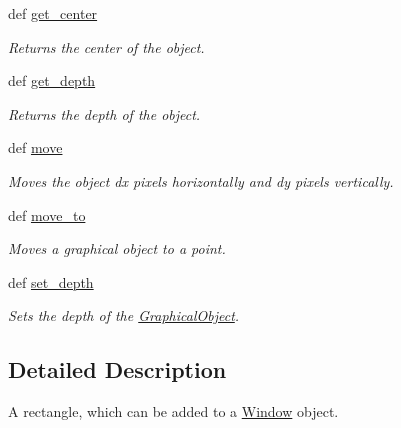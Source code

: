 \begin{DoxyCompactItemize}
def \hyperlink{classcs110graphics_1_1GraphicalObject_a062789c4cc9de38af32dcc4ff2058607}{get\_\-center}
\begin{DoxyCompactList}\small\item\em Returns the center of the object. \item\end{DoxyCompactList}\item 
def \hyperlink{classcs110graphics_1_1GraphicalObject_a6d9f5718cd0cf249e0d2842971bae17f}{get\_\-depth}
\begin{DoxyCompactList}\small\item\em Returns the depth of the object. \item\end{DoxyCompactList}\item 
def \hyperlink{classcs110graphics_1_1GraphicalObject_aa64d270fb83efa4a54e1a7953512f9cd}{move}
\begin{DoxyCompactList}\small\item\em Moves the object dx pixels horizontally and dy pixels vertically. \item\end{DoxyCompactList}\item 
def \hyperlink{classcs110graphics_1_1GraphicalObject_abe2d480265df7ac9447205c52c6946df}{move\_\-to}
\begin{DoxyCompactList}\small\item\em Moves a graphical object to a point. \item\end{DoxyCompactList}\item 
def \hyperlink{classcs110graphics_1_1GraphicalObject_a20d76d4ee4419c3065d61deb6cbc6700}{set\_\-depth}
\begin{DoxyCompactList}\small\item\em Sets the depth of the \hyperlink{classcs110graphics_1_1GraphicalObject}{GraphicalObject}. \item\end{DoxyCompactList}\end{DoxyCompactItemize}


\subsection{Detailed Description}
A rectangle, which can be added to a \hyperlink{classcs110graphics_1_1Window}{Window} object. 

